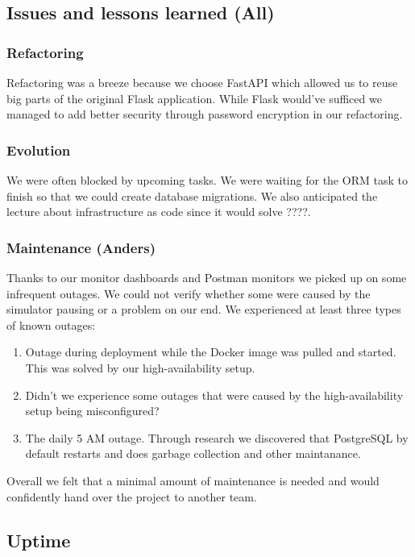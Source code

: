 \documentclass{article}
\begin{document}
\subsection{Issues and lessons learned (All)}


\subsubsection{Refactoring} 

Refactoring was a breeze because we choose FastAPI which allowed us to reuse big parts of the original Flask application. While Flask would've sufficed we managed to add better security through password encryption in our refactoring. 

\subsubsection{Evolution}

We were often blocked by upcoming tasks. We were waiting for the ORM task to finish so that we could create database migrations. We also anticipated the lecture about infrastructure as code since it would solve ????.

\subsubsection{Maintenance (Anders)}

Thanks to our monitor dashboards and Postman monitors we picked up on some infrequent outages. We could not verify whether some were caused by the simulator pausing or a problem on our end. We experienced at least three types of known outages:

\begin{enumerate}
    \item Outage during deployment while the Docker image was pulled and started. This was solved by our high-availability setup. 
    \item Didn't we experience some outages that were caused by the high-availability setup being misconfigured?
    \item The daily 5 AM outage. Through research we discovered that PostgreSQL by default restarts and does garbage collection and other maintanance. 
\end{enumerate}

Overall we felt that a minimal amount of maintenance is needed and would confidently hand over the project to another team. 

\subsection{Uptime}
\end{document}

